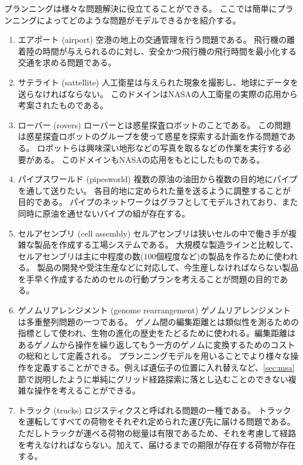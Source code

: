 プランニングは様々な問題解決に役立てることができる。
ここでは簡単にプランニングによってどのような問題がモデルできるかを紹介する。

\begin{enumerate}
\item エアポート (airport)
空港の地上の交通管理を行う問題である。
飛行機の離着陸の時間が与えられるのに対し、安全かつ飛行機の飛行時間を最小化する交通を求める問題である。

\item サテライト (sattellite)
人工衛星は与えられた現象を撮影し、地球にデータを送らなければならない。
このドメインはNASAの人工衛星の実際の応用から考案されたものである。

\item ローバー (rovers)
ローバーとは惑星探査ロボットのことである。
この問題は惑星探査ロボットのグループを使って惑星を探索する計画を作る問題である。
ロボットらは興味深い地形などの写真を取るなどの作業を実行する必要がある。
このドメインもNASAの応用をもとにしたものである。

\item パイプスワールド (pipesworld)
複数の原油の油田から複数の目的地にパイプを通して送りたい。
各目的地に定められた量を送るように調整することが目的である。
パイプのネットワークはグラフとしてモデルされており、また同時に原油を通せないパイプの組が存在する。

\item セルアセンブリ (cell assembly)
セルアセンブリは狭いセルの中で働き手が複雑な製品を作成する工場システムである。
大規模な製造ラインと比較して、
セルアセンブリは主に中程度の数(100個程度など)の製品を作るために使われる。
製品の開発や受注生産などに対応して、今生産しなければならない製品を手早く作成するためのセルの行動プランを考えることが問題の目的である。
\cite{asai2014fully}

\item ゲノムリアレンジメント (genome rearrangement)
ゲノムリアレンジメントは多重整列問題の一つである。
ゲノム間の編集距離とは類似性を測るための指標として使われ、生物の進化の歴史をたどるために使われる。編集距離はあるゲノムから操作を繰り返してもう一方のゲノムに変換するためのコストの総和として定義される。
プランニングモデルを用いることでより様々な操作を定義することができる。例えば遺伝子の位置に入れ替えなど、\ref{sec:msa}節で説明したように単純にグリッド経路探索に落とし込むことのできない複雑な操作を考えることができる。
\cite{erdem2005genome}

\item トラック (trucks)
ロジスティクスと呼ばれる問題の一種である。
トラックを運転してすべての荷物をそれぞれ定められた運び先に届ける問題である。
ただしトラックが運べる荷物の総量は有限であるため、それを考慮して経路を考えなければならない。加えて、届けるまでの期限が存在する荷物が存在する。

\end{enumerate}

